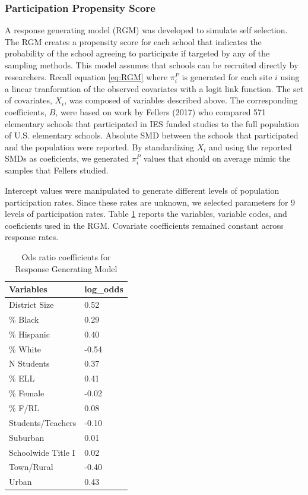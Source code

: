 \documentclass[man,floatsintext]{apa6}
\begin{document}
\hypertarget{participation-propensity-score}{%
\subsubsection{Participation Propensity Score}\label{participation-propensity-score}}

A response generating model (RGM) was developed to simulate self selection. The RGM creates a propensity score for each school that indicates the probability of the school agreeing to participate if targeted by any of the sampling methods. This model assumes that schools can be recruited directly by researchers. Recall equation \eqref{eq:RGM} where \(\pi^P_i\) is generated for each site \(i\) using a linear tranformtion of the observed covariates with a logit link function. The set of covariates, \(X_i\), was composed of variables described above. The corresponding coefficients, \(B\), were based on work by Fellers (2017) who compared 571 elementary schools that participated in IES funded studies to the full population of U.S. elementary schools. Absolute SMD between the schools that participated and the population were reported. By standardizing \(X_i\) and using the reported SMDs as coeficients, we generated \(\pi^P_i\) values that should on average mimic the samples that Fellers studied.

Intercept values were manipulated to generate different levels of population participation rates. Since these rates are unknown, we selected parameters for 9 levels of participation rates. Table \ref{tab:tab-RGM-Pars} reports the variables, variable codes, and coeficients used in the RGM. Covariate coefficients remained constant across response rates.

\begin{table}[tbp]
\begin{center}
\begin{threeparttable}
\caption{\label{tab:tab-RGM-Pars}Ods ratio coefficients for Response Generating Model}
\begin{tabular}{ll}
\toprule
Variables & \multicolumn{1}{c}{log\_odds}\\
\midrule
District Size & 0.52\\
\% Black & 0.29\\
\% Hispanic & 0.40\\
\% White & -0.54\\
N Students & 0.37\\
\% ELL & 0.41\\
\% Female & -0.02\\
\% F/RL & 0.08\\
Students/Teachers & -0.10\\
Suburban & 0.01\\
Schoolwide Title I & 0.02\\
Town/Rural & -0.40\\
Urban & 0.43\\
\bottomrule
\end{tabular}
\end{threeparttable}
\end{center}
\end{table}
\end{document}
